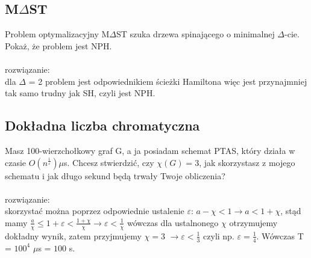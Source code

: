 \documentclass{article}
\begin{document}
\subsection*{M$\Delta$ST}
Problem optymalizacyjny M$\Delta$ST szuka drzewa spinającego o minimalnej $\Delta$-cie.
Pokaż, że problem jest NPH. \\\\rozwiązanie:\\
dla $\Delta$ = 2 problem jest odpowiednikiem ścieżki Hamiltona
więc jest przynajmniej tak samo trudny jak SH, czyli jest NPH.


\subsection*{Dokładna liczba chromatyczna}
Masz 100-wierzchołkowy graf G, a ja posiadam schemat PTAS, który działa w czasie
$O(n^{\frac{1}{\varepsilon}}) \mu$s. Chcesz stwierdzić, czy $\chi(G) = 3$, 
jak skorzystasz z mojego schematu i jak długo sekund będą trwały Twoje obliczenia?
 \\\\rozwiązanie:\\
skorzystać można poprzez odpowiednie ustalenie $\varepsilon$: 
 $a - \chi < 1 \rightarrow a  < 1 + \chi$, stąd mamy 
$\frac{a}{\chi} \leq 1 + \varepsilon < \frac{1 + \chi}{\chi} \rightarrow \varepsilon < \frac{1}{\chi}$ 
wówczas dla ustalnonego $\chi$ otrzymujemy dokładny wynik, zatem przyjmujemy 
$\chi = 3$ $\rightarrow \varepsilon < \frac{1}{3}$  czyli np. $\varepsilon = \frac{1}{4}$. 
Wówczas T = $100^4$ $\mu$s = $100$ s. 
\end{document}
